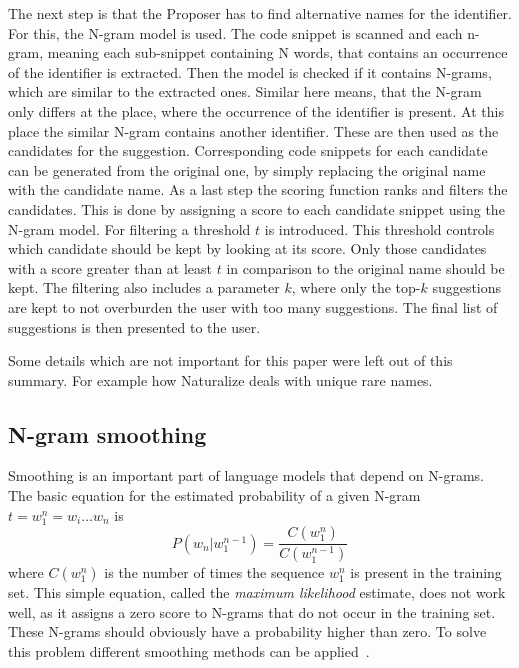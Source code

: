 The next step is that the Proposer has to find alternative names for the identifier. For this, the N-gram model is used. The code snippet is scanned and each n-gram, meaning each sub-snippet containing N words, that contains an occurrence of the identifier is extracted. Then the model is checked if it contains N-grams, which are similar to the extracted ones. Similar here means, that the N-gram only differs at the place, where the occurrence of the identifier is present. At this place the similar N-gram contains another identifier. These are then used as the candidates for the suggestion. Corresponding code snippets for each candidate can be generated from the original one, by simply replacing the original name with the candidate name. As a last step the scoring function ranks and filters the candidates. This is done by assigning a score to each candidate snippet using the N-gram model.
For filtering a threshold $t$ is introduced. This threshold controls which candidate should be kept by looking at its score. Only those candidates with
a score greater than at least $t$ in comparison to the original name should be kept. The filtering also includes a parameter $k$, where only the top-$k$ suggestions are kept to not overburden the user with too many suggestions. The final list of suggestions is then presented to the user.

Some details which are not important for this paper were left out of this summary. For example how
Naturalize deals with unique rare names.

\subsection{N-gram smoothing}
Smoothing is an important part of language models that depend on N-grams. The basic equation for the estimated probability of a given N-gram $t=w_1^n=w_i\hdots w_n$ is
\begin{equation}
    P(w_n | w_1^{n-1}) =  \frac{C(w_1^n)}{C(w_1^{n-1})}
\end{equation}
where $C(w_1^n)$ is the number of times the sequence $w_1^n$ is present in the training set.
This simple equation, called the \emph{maximum likelihood} estimate, does not work well, as it assigns a zero score to N-grams that do not occur in the training set. These N-grams should obviously have a probability higher than zero. To solve this problem different smoothing methods can be applied~\cite{smoothingStudy}.

